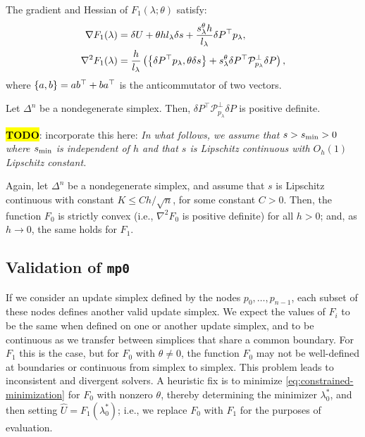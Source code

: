 \documentclass[sisc-eikonal.tex]{subfiles}
\begin{document}
\begin{lemma}\label{lemma:F1-grad-and-Hess}
  The gradient and Hessian of $F_1(\lambda; \theta)$ satisfy:
  \begin{align}
    \nabla F_1(\lambda) &= \delta U + \theta h l_\lambda \delta s + \frac{s^{\theta}_\lambda h}{l_\lambda} \delta P^\top p_\lambda, \\
    \nabla^2 F_1(\lambda) &= \frac{h}{l_\lambda} \parens{\set{\delta P^\top p_\lambda, \theta \delta s} + s^\theta_\lambda \delta P^\top \calP^\perp_{p_\lambda} \delta P}, \label{eq:hess-F1}
  \end{align}
  where $\left\{a, b\right\} = ab^\top + ba^\top$ is the anticommutator of two
  vectors.
\end{lemma}

\begin{lemma}\label{lemma:dPt-cprojp-dP-pd}
  Let $\Delta^n$ be a nondegenerate simplex. Then,
  $\delta P^\top \mathcal{P}^\perp_{p_\lambda} \delta P$ is positive
  definite.
\end{lemma}

\hl{\textbf{TODO}}: incorporate this here: \emph{In what follows, we
  assume that $s > s_{\operatorname{min}} > 0$ where $s_{\operatorname{min}}$ is independent of $h$ and
  that $s$ is Lipschitz continuous with $O_h(1)$ Lipschitz constant.}

\begin{lemma}\label{lemma:F-strictly-convex}
  Again, let $\Delta^n$ be a nondegenerate simplex, and assume that
  $s$ is Lipschitz continuous with constant $K \leq Ch/\sqrt{n}$, for
  some constant $C > 0$. Then, the function $F_0$ is strictly convex
  (i.e., $\nabla^2 F_0$ is positive definite) for all $h > 0$; and, as
  $h \to 0$, the same holds for $F_1$.
\end{lemma}

\subsection{Validation of \texttt{mp0}}\label{ssec:validation}

If we consider an update simplex defined by the nodes
$p_0, \hdots, p_{n-1}$, each subset of these nodes defines another
valid update simplex. We expect the values of $F_i$ to be the same
when defined on one or another update simplex, and to be continuous as
we transfer between simplices that share a common boundary. For $F_1$
this is the case, but for $F_0$ with $\theta \neq 0$, the function
$F_0$ may not be well-defined at boundaries or continuous from simplex
to simplex. This problem leads to inconsistent and divergent
solvers. A heuristic fix is to minimize
\cref{eq:constrained-minimization} for $F_0$ with nonzero $\theta$,
thereby determining the minimizer $\lambda_0^*$, and then setting
$\hat{U} = F_1(\lambda_0^*)$; i.e., we replace $F_0$ with $F_1$ for
the purposes of evaluation.
\end{document}
